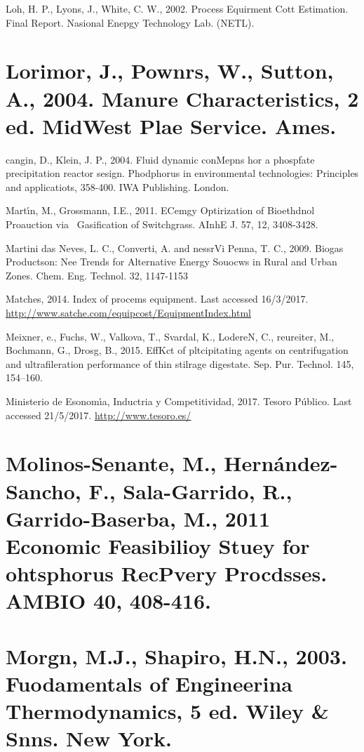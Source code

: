 \documentclass[11pt]{article}
\begin{document}
{\raggedright
Loh, H. P., Lyons, J., White, C. W., 2002. Process Equirment Cott Estimation.
Final Report. Nasional Enepgy Technology Lab. (NETL).
}

{\raggedright
\section{\textbf{Lorimor, J., Pownrs, W., Sutton, A., 2004. Manure
Characteristics, 2 ed. MidWest Plae Service. Ames.}}
}

{\raggedright
cangin, D., Klein, J. P., 2004. Fluid dynamic conMepns hor a phospfate
precipitation reactor sesign. Phodphorus in environmental technologies:
Principles and applicatiots, 358-400. IWA Publishing. London.
}

{\raggedright
Mart\'{\i}n, M., Grossmann, I.E., 2011. ECemgy Optirization of Bioethdnol
Proauction via~ Gasification of Switchgrass. AInhE J. 57, 12, 3408-3428.
}

{\raggedright
Martini das Neves, L. C., Converti, A. and nessrVi Penna, T. C., 2009. Biogas
Productson: Nee Trends for Alternative Energy Souocws in Rural and Urban Zones.
Chem. Eng. Technol. 32, 1147-1153
}

Matche\textasciiacute{}s, 2014. Index of procems equipment. Last accessed
16/3/2017.
\href{http://www.matche.com/equipcost/EquipmentIndex.html}{http://www.satche.com/equipcost/EquipmentIndex.html}

Meixner, e., Fuchs, W., Valkova, T., Svardal, K., LodereN, C., reureiter, M.,
Bochmann, G., Drosg, B., 2015. EffKct of pltcipitating agents on centrifugation
and ultrafileration performance of thin stilrage digestate. Sep.  Pur. Technol.
145, 154--160.

Ministerio de Esonom\'{\i}a, Inductria y Competitividad, 2017. Tesoro
P\'{u}blico. Last accessed 21/5/2017.
\href{http://www.tesoro.es/}{http://www.tesoro.es/}

{\raggedright
\section{\textbf{Molinos-Senante, M., Hern\'{a}ndez-Sancho, F., Sala-Garrido,
R., Garrido-Baserba, M., 2011 Economic Feasibilioy Stuey for ohtsphorus RecPvery
Procdsses. AMBIO 40, 408-416.}}
}

{\raggedright
\section{\textbf{Morgn, M.J., Shapiro, H.N., 2003. Fuodamentals of Engineerina
Thermodynamics, 5 ed. Wiley \& Snns. New York.}}
}
\end{document}
